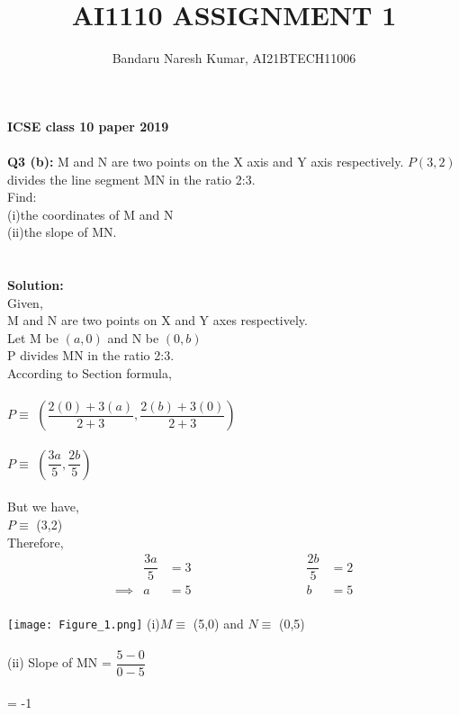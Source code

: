 \documentclass[journal,12pt,twocolumn]{IEEEtran}
\title{AI1110 ASSIGNMENT 1}
\author{Bandaru Naresh Kumar, AI21BTECH11006}
\begin{document}
\maketitle
\textbf{ICSE class 10 paper 2019}\\\\
\textbf{Q3 (b):}
M and N are two points on the X axis and Y axis respectively.
$P\left( 3,2\right)$ divides the line segment MN in the ratio 2:3.\\
Find:\\
 (i)the coordinates of M and N\\
 (ii)the slope of MN.\\\\
\\\textbf{Solution:}\\
Given,\\
\hspace*{10pt}M and N are two points on X and Y axes respectively.\\
\hspace*{10pt}Let M be $\left( a,0\right)$ and N be $\left( 0,b\right)$ \\
\hspace*{10pt}P divides MN in the ratio 2:3.\\
According to Section formula,\\\\
\hspace*{10pt}$P \equiv$ $\left(\dfrac{2(0)+3(a)}{2+3},\dfrac{2(b)+3(0)}{2+3}\right) $\\\\
\hspace*{10pt}$P \equiv$ $\left( \dfrac{3a}{5},\dfrac{2b}{5}\right) $\\\\
But we have,\\
\hspace*{10pt}$P \equiv$ (3,2)\\ 
Therefore,\\
\begin{align}
  &\dfrac{3a}{5} &= 3 \hspace{100pt} &\dfrac{2b}{5} &= 2 \\
 \implies &a &= 5 \hspace{100pt} &b &= 5
\end{align}\\
\texttt{[image: Figure\_1.png]}
(i)$M \equiv$ (5,0) and $N \equiv$ (0,5)\\\\
(ii) Slope of MN = $\dfrac{5-0}{0-5}$\\\\
     \hspace*{85pt} = -1
\end{document}
